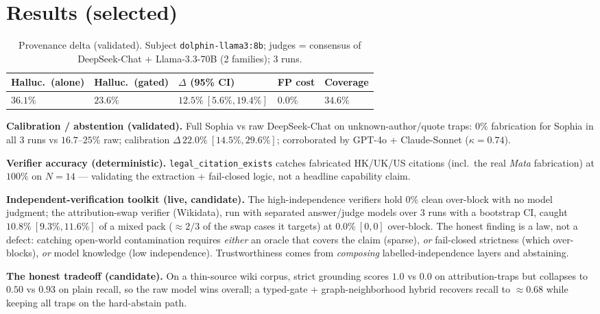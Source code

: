 \documentclass[11pt]{article}
\begin{document}
\section{Results (selected)}
\begin{table}[h]\centering
\caption{Provenance delta (validated). Subject \texttt{dolphin-llama3:8b}; judges = consensus of
DeepSeek-Chat + Llama-3.3-70B (2 families); 3 runs.}
\begin{tabular}{lllll}
\toprule
Halluc.\ (alone) & Halluc.\ (gated) & $\Delta$ (95\% CI) & FP cost & Coverage \\
\midrule
$36.1\%$ & $23.6\%$ & $\mathbf{12.5\%\ [5.6\%, 19.4\%]}$ & $\mathbf{0.0\%}$ & $34.6\%$ \\
\bottomrule
\end{tabular}
\end{table}

\textbf{Calibration / abstention (validated).} Full Sophia vs raw DeepSeek-Chat on
unknown-author/quote traps: $0\%$ fabrication for Sophia in all 3 runs vs $16.7$--$25\%$ raw;
calibration $\Delta\,22.0\%\ [14.5\%, 29.6\%]$; corroborated by GPT-4o + Claude-Sonnet ($\kappa = 0.74$).

\textbf{Verifier accuracy (deterministic).} \texttt{legal\_citation\_exists} catches fabricated
HK/UK/US citations (incl.\ the real \emph{Mata} fabrication) at $100\%$ on $N{=}14$ --- validating
the extraction + fail-closed logic, not a headline capability claim.

\textbf{Independent-verification toolkit (live, candidate).} The high-independence verifiers hold
$0\%$ clean over-block with no model judgment; the attribution-swap verifier (Wikidata), run with
separated answer/judge models over 3 runs with a bootstrap CI, caught $10.8\%\ [9.3\%, 11.6\%]$ of
a mixed pack ($\approx 2/3$ of the swap cases it targets) at $0.0\%\ [0,0]$ over-block. The honest
finding is a law, not a defect: catching open-world contamination requires \emph{either} an oracle
that covers the claim (sparse), \emph{or} fail-closed strictness (which over-blocks), \emph{or}
model knowledge (low independence). Trustworthiness comes from \emph{composing}
labelled-independence layers and abstaining.

\textbf{The honest tradeoff (candidate).} On a thin-source wiki corpus, strict grounding scores
$1.0$ vs $0.0$ on attribution-traps but collapses to $0.50$ vs $0.93$ on plain recall, so the raw
model wins overall; a typed-gate + graph-neighborhood hybrid recovers recall to $\approx 0.68$
while keeping all traps on the hard-abstain path.
\end{document}
